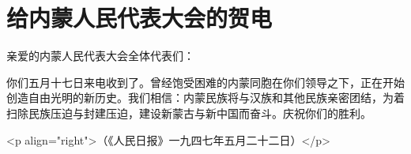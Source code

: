 \section[给内蒙人民代表大会的贺电（一九四七年五月十九日）]{给内蒙人民代表大会的贺电}


亲爱的内蒙人民代表大会全体代表们：

你们五月十七日来电收到了。曾经饱受困难的内蒙同胞在你们领导之下，正在开始创造自由光明的新历史。我们相信：内蒙民族将与汉族和其他民族亲密团结，为着扫除民族压迫与封建压迫，建设新蒙古与新中国而奋斗。庆祝你们的胜利。

<p align="right">（《人民日报》一九四七年五月二十二日）</p>

